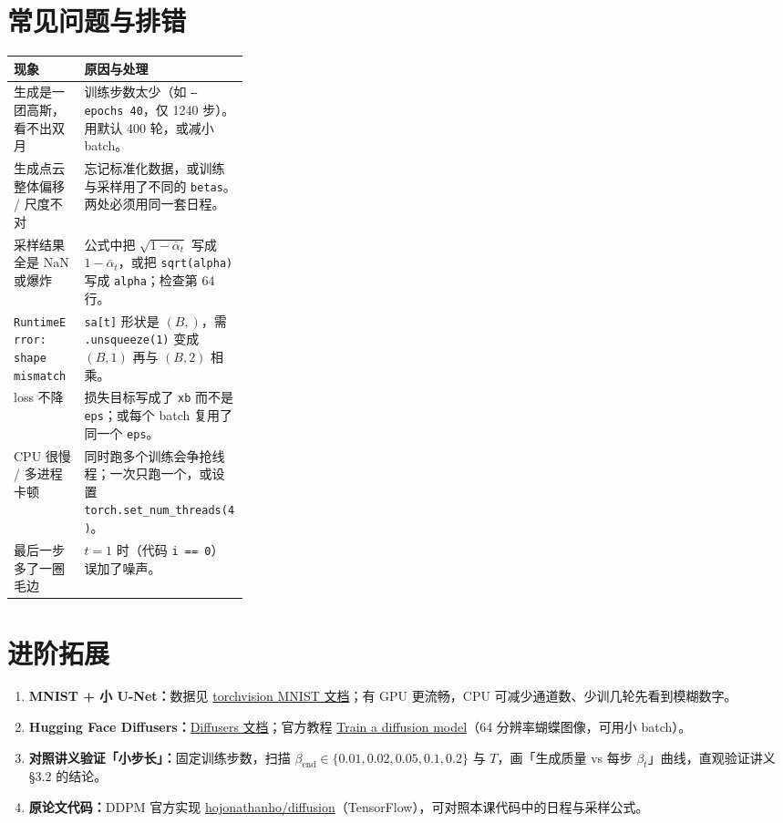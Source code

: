 \documentclass[a4paper,fontset=none,zihao=5]{ctexart}
\newcommand{\abar}{\bar{\alpha}}
\newcommand{\code}[1]{\texttt{#1}}
\begin{document}
\section{常见问题与排错}
\begin{center}\small
\renewcommand{\arraystretch}{1.3}
\begin{tabularx}{\linewidth}{@{}>{\raggedright\arraybackslash}p{0.3\linewidth}X@{}}
\toprule
现象 & 原因与处理 \\
\midrule
生成是一团高斯，看不出双月 & 训练步数太少（如 \code{--epochs 40}，仅 1240 步）。用默认 400 轮，或减小 batch。 \\
生成点云整体偏移 / 尺度不对 & 忘记标准化数据，或训练与采样用了不同的 \code{betas}。两处必须用同一套日程。 \\
采样结果全是 NaN 或爆炸 & 公式中把 $\sqrt{1-\abar_t}$ 写成 $1-\abar_t$，或把 \code{sqrt(alpha)} 写成 \code{alpha}；检查第 64 行。 \\
\code{RuntimeError: shape mismatch} & \code{sa[t]} 形状是 $(B,)$，需 \code{.unsqueeze(1)} 变成 $(B,1)$ 再与 $(B,2)$ 相乘。 \\
loss 不降 & 损失目标写成了 \code{xb} 而不是 \code{eps}；或每个 batch 复用了同一个 \code{eps}。 \\
CPU 很慢 / 多进程卡顿 & 同时跑多个训练会争抢线程；一次只跑一个，或设置 \code{torch.set\_num\_threads(4)}。 \\
最后一步多了一圈毛边 & $t=1$ 时（代码 \code{i == 0}）误加了噪声。 \\
\bottomrule
\end{tabularx}
\end{center}

\section{进阶拓展}
\begin{enumerate}[leftmargin=2em,itemsep=2pt]
  \item \textbf{MNIST + 小 U-Net：}数据见 \href{https://docs.pytorch.org/vision/stable/generated/torchvision.datasets.MNIST.html}{torchvision MNIST 文档}；有 GPU 更流畅，CPU 可减少通道数、少训几轮先看到模糊数字。
  \item \textbf{Hugging Face Diffusers：}\href{https://huggingface.co/docs/diffusers/index}{Diffusers 文档}；官方教程 \href{https://huggingface.co/docs/diffusers/tutorials/basic_training}{Train a diffusion model}（64 分辨率蝴蝶图像，可用小 batch）。
  \item \textbf{对照讲义验证「小步长」：}固定训练步数，扫描 $\beta_{\text{end}}\in\{0.01,0.02,0.05,0.1,0.2\}$ 与 $T$，画「生成质量 vs 每步 $\beta_t$」曲线，直观验证讲义 §3.2 的结论。
  \item \textbf{原论文代码：}DDPM 官方实现 \href{https://github.com/hojonathanho/diffusion}{hojonathanho/diffusion}（TensorFlow），可对照本课代码中的日程与采样公式。
\end{enumerate}
\end{document}
